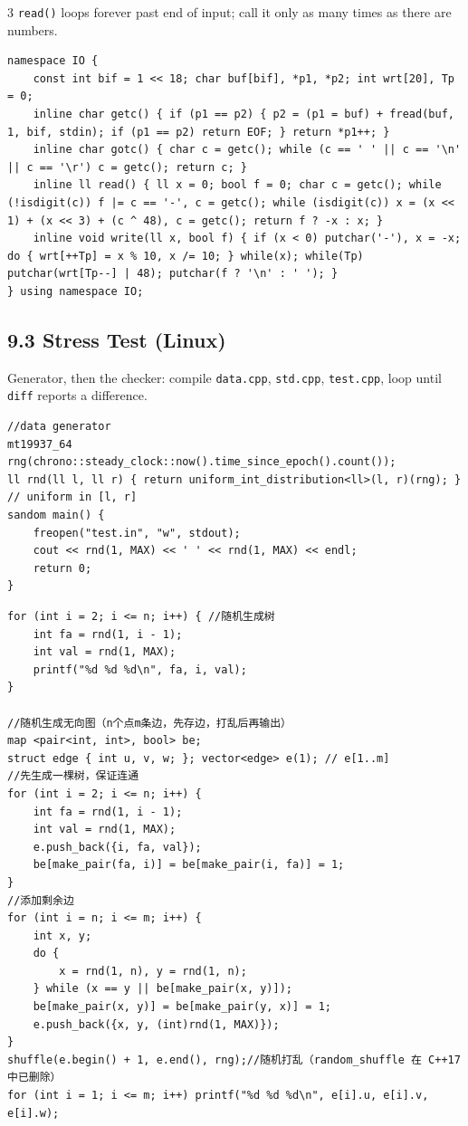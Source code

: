 \documentclass[8pt]{extarticle}
\begin{document}
\begin{multicols*}{3}
\texttt{read()} loops forever past end of input; call it only as many times as there are numbers.

\begin{lstlisting}
namespace IO {
    const int bif = 1 << 18; char buf[bif], *p1, *p2; int wrt[20], Tp = 0;
    inline char getc() { if (p1 == p2) { p2 = (p1 = buf) + fread(buf, 1, bif, stdin); if (p1 == p2) return EOF; } return *p1++; }
    inline char gotc() { char c = getc(); while (c == ' ' || c == '\n' || c == '\r') c = getc(); return c; }
    inline ll read() { ll x = 0; bool f = 0; char c = getc(); while (!isdigit(c)) f |= c == '-', c = getc(); while (isdigit(c)) x = (x << 1) + (x << 3) + (c ^ 48), c = getc(); return f ? -x : x; }
    inline void write(ll x, bool f) { if (x < 0) putchar('-'), x = -x; do { wrt[++Tp] = x % 10, x /= 10; } while(x); while(Tp) putchar(wrt[Tp--] | 48); putchar(f ? '\n' : ' '); }
} using namespace IO;
\end{lstlisting}

\subsection*{9.3 Stress Test (Linux)}

Generator, then the checker: compile \texttt{data.cpp}, \texttt{std.cpp}, \texttt{test.cpp}, loop until \texttt{diff} reports a difference.

\begin{lstlisting}
//data generator
mt19937_64 rng(chrono::steady_clock::now().time_since_epoch().count());
ll rnd(ll l, ll r) { return uniform_int_distribution<ll>(l, r)(rng); } // uniform in [l, r]
sandom main() {
    freopen("test.in", "w", stdout);
    cout << rnd(1, MAX) << ' ' << rnd(1, MAX) << endl;
    return 0;
}
\end{lstlisting}

\begin{lstlisting}
for (int i = 2; i <= n; i++) { //随机生成树
    int fa = rnd(1, i - 1);
    int val = rnd(1, MAX);
    printf("%d %d %d\n", fa, i, val);
}

//随机生成无向图（n个点m条边，先存边，打乱后再输出）
map <pair<int, int>, bool> be;
struct edge { int u, v, w; }; vector<edge> e(1); // e[1..m]
//先生成一棵树，保证连通
for (int i = 2; i <= n; i++) {
    int fa = rnd(1, i - 1);
    int val = rnd(1, MAX);
    e.push_back({i, fa, val});
    be[make_pair(fa, i)] = be[make_pair(i, fa)] = 1;
}
//添加剩余边
for (int i = n; i <= m; i++) {
    int x, y;
    do {
        x = rnd(1, n), y = rnd(1, n);
    } while (x == y || be[make_pair(x, y)]);
    be[make_pair(x, y)] = be[make_pair(y, x)] = 1;
    e.push_back({x, y, (int)rnd(1, MAX)});
}
shuffle(e.begin() + 1, e.end(), rng);//随机打乱（random_shuffle 在 C++17 中已删除）
for (int i = 1; i <= m; i++) printf("%d %d %d\n", e[i].u, e[i].v, e[i].w);
\end{lstlisting}


\end{multicols*}
\end{document}
